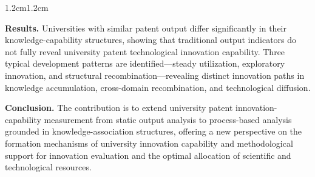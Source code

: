 \begin{adjustwidth}{1.2cm}{1.2cm}
\begin{structuredabstract}
\medskip\textbf{Results.} Universities with similar patent output differ significantly in their knowledge-capability structures, showing that traditional output indicators do not fully reveal university patent technological innovation capability. Three typical development patterns are identified---steady utilization, exploratory innovation, and structural recombination---revealing distinct innovation paths in knowledge accumulation, cross-domain recombination, and technological diffusion.

\medskip\textbf{Conclusion.} The contribution is to extend university patent innovation-capability measurement from static output analysis to process-based analysis grounded in knowledge-association structures, offering a new perspective on the formation mechanisms of university innovation capability and methodological support for innovation evaluation and the optimal allocation of scientific and technological resources.
\end{structuredabstract}
\end{adjustwidth}
